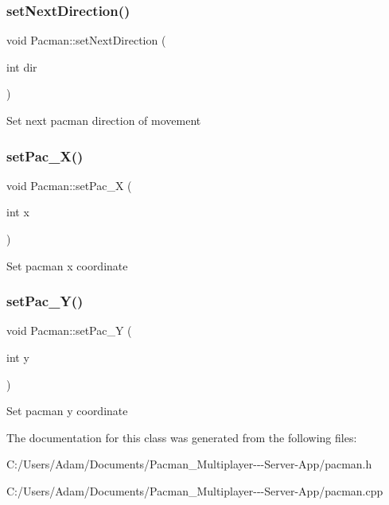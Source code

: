 \subsubsection{\texorpdfstring{set\+Next\+Direction()}{setNextDirection()}}
{\footnotesize\ttfamily void Pacman\+::set\+Next\+Direction (\begin{DoxyParamCaption}\item[{int}]{dir }\end{DoxyParamCaption})\hspace{0.3cm}{\ttfamily [inline]}}

Set next pacman direction of movement \mbox{\label{class_pacman_a2cbe5344bf0a7e29524bb7f026798304}} 
\subsubsection{\texorpdfstring{set\+Pac\+\_\+\+X()}{setPac\_X()}}
{\footnotesize\ttfamily void Pacman\+::set\+Pac\+\_\+X (\begin{DoxyParamCaption}\item[{int}]{x }\end{DoxyParamCaption})\hspace{0.3cm}{\ttfamily [inline]}}

Set pacman x coordinate \mbox{\label{class_pacman_a416b6b39586797636222e40fea820522}} 
\subsubsection{\texorpdfstring{set\+Pac\+\_\+\+Y()}{setPac\_Y()}}
{\footnotesize\ttfamily void Pacman\+::set\+Pac\+\_\+Y (\begin{DoxyParamCaption}\item[{int}]{y }\end{DoxyParamCaption})\hspace{0.3cm}{\ttfamily [inline]}}

Set pacman y coordinate 

The documentation for this class was generated from the following files\+:\begin{DoxyCompactItemize}
\item 
C\+:/\+Users/\+Adam/\+Documents/\+Pacman\+\_\+\+Multiplayer-\/-\/-\/\+Server-\/\+App/pacman.\+h\item 
C\+:/\+Users/\+Adam/\+Documents/\+Pacman\+\_\+\+Multiplayer-\/-\/-\/\+Server-\/\+App/pacman.\+cpp\end{DoxyCompactItemize}
